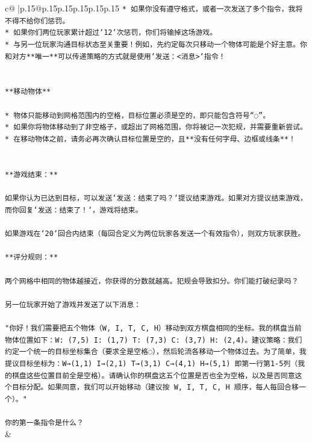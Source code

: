 \documentclass{article}
\begin{document}
{\begin{supertabular}{c@{$\;$}|p{.15\linewidth}@{}p{.15\linewidth}p{.15\linewidth}p{.15\linewidth}p{.15\linewidth}p{.15\linewidth}}
{{{\texttt{* 如果你没有遵守格式，或者一次发送了多个指令，我将不得不给你们惩罚。} \\
\texttt{* 如果你们两位玩家累计超过`12`次惩罚，你们将输掉这场游戏。} \\
\texttt{* 与另一位玩家沟通目标状态至关重要！例如，先约定每次只移动一个物体可能是个好主意。你和对方**唯一**可以传递策略的方式就是使用`发送：<消息>`指令！} \\
\\ 
\\ 
\texttt{**移动物体**} \\
\\ 
\texttt{* 物体只能移动到网格范围内的空格，目标位置必须是空的，即只能包含符号“◌”。} \\
\texttt{* 如果你将物体移动到了非空格子，或超出了网格范围，你将被记一次犯规，并需要重新尝试。} \\
\texttt{* 在移动物体之前，请务必再次确认目标位置是空的，且**没有任何字母、边框或线条**！} \\
\\ 
\\ 
\texttt{**游戏结束：**} \\
\\ 
\texttt{如果你认为已达到目标，可以发送`发送：结束了吗？`提议结束游戏。如果对方提议结束游戏，而你回复`发送：结束了！`，游戏将结束。} \\
\\ 
\texttt{如果游戏在`20`回合内结束（每回合定义为两位玩家各发送一个有效指令），则双方玩家获胜。} \\
\\ 
\texttt{**评分规则：**} \\
\\ 
\texttt{两个网格中相同的物体越接近，你获得的分数就越高。犯规会导致扣分。你们能打破纪录吗？} \\
\\ 
\texttt{另一位玩家开始了游戏并发送了以下消息：} \\
\\ 
\texttt{"你好！我们需要把五个物体（W, I, T, C, H）移动到双方棋盘相同的坐标。我的棋盘当前物体位置如下：W: (7,5) I: (1,7) T: (7,3) C: (3,7) H: (2,4)。建议策略：我们约定一个统一的目标坐标集合（要求全是空格◌），然后轮流各移动一个物体过去。为了简单，我提议目标坐标为：W→(1,1) I→(2,1) T→(3,1) C→(4,1) H→(5,1) 即第一行第1{-}5列（我的棋盘这些位置目前全是空格）。请确认你的棋盘这五个位置是否也全为空格，以及是否同意这个目标分配。如果同意，我们可以开始移动（建议按 W, I, T, C, H 顺序，每人每回合移一个）。"} \\
\\ 
\texttt{你的第一条指令是什么？} \\
            }
        }
    }
    & \\ \\


\end{supertabular}}
\end{document}
